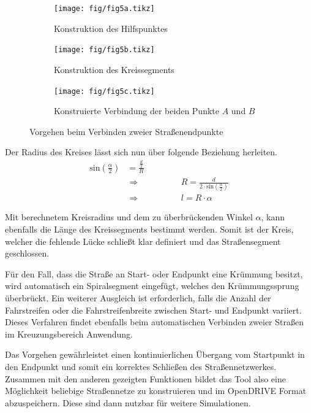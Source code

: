 \begin{figure}[H]
\flushleft
\begin{subfigure}{0.32\textwidth}
\vspace{1.2cm}
\texttt{[image: fig/fig5a.tikz]}
\caption{Konstruktion des Hilfspunktes}
\end{subfigure}
\begin{subfigure}{0.32\textwidth}
\texttt{[image: fig/fig5b.tikz]}
\caption{Konstruktion des Kreissegments}
\end{subfigure}
\begin{subfigure}{0.32\textwidth}
\vspace{1.65cm}
\texttt{[image: fig/fig5c.tikz]}
\caption{Konstruierte Verbindung der beiden Punkte \(A\) und \(B\)}
\end{subfigure}
\caption{Vorgehen beim Verbinden zweier Straßenendpunkte}
\label{abb5}
\end{figure}

Der Radius des Kreises lässt sich nun über folgende Beziehung herleiten.
\begin{align}
\text{sin}(\frac{\alpha}{2}) &= \frac{\frac{d}{2}}{R} \\
&\Rightarrow \hspace{2cm} R = \frac{d}{2 \cdot \text{sin}(\frac{\alpha}{2})} \\
&\Rightarrow \hspace{2cm} l = R \cdot \alpha
\end{align}

Mit berechnetem Kreisradius und dem zu überbrückenden Winkel \(\alpha\), kann ebenfalls die Länge des Kreissegments bestimmt werden. Somit ist der Kreis, welcher die fehlende Lücke schließt klar definiert und das Straßensegment geschlossen.

Für den Fall, dass die Straße an Start- oder Endpunkt eine Krümmung besitzt, wird automatisch ein Spiralsegment eingefügt, welches den Krümmungssprung überbrückt. Ein weiterer Ausgleich ist erforderlich, falls die Anzahl der Fahrstreifen oder die Fahrstreifenbreite zwischen Start- und Endpunkt variiert. Dieses Verfahren findet ebenfalls beim automatischen Verbinden zweier Straßen im Kreuzungsbereich Anwendung.

Das Vorgehen gewährleistet einen kontinuierlichen Übergang vom Startpunkt in den Endpunkt und somit ein korrektes Schließen des Straßennetzwerkes. Zusammen mit den anderen gezeigten Funktionen bildet das Tool also eine Möglichkeit beliebige Straßennetze zu konstruieren und im OpenDRIVE Format abzuspeichern. Diese sind dann nutzbar für weitere Simulationen.

